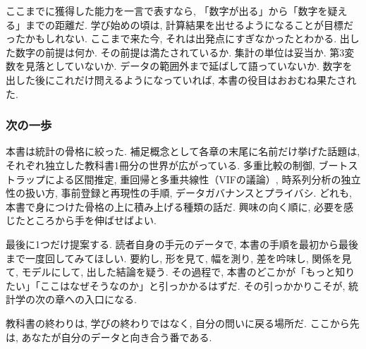 ここまでに獲得した能力を一言で表すなら, 「数字が出る」から「数字を疑える」までの距離だ.
学び始めの頃は, 計算結果を出せるようになることが目標だったかもしれない.
ここまで来た今, それは出発点にすぎなかったとわかる.
出した数字の前提は何か. その前提は満たされているか. 集計の単位は妥当か. 第3変数を見落としていないか. データの範囲外まで延ばして語っていないか.
数字を出した後にこれだけ問えるようになっていれば, 本書の役目はおおむね果たされた.

\subsubsection*{次の一歩}

本書は統計の骨格に絞った. 補足概念として各章の末尾に名前だけ挙げた話題は, それぞれ独立した教科書1冊分の世界が広がっている.
多重比較の制御, ブートストラップによる区間推定, 重回帰と多重共線性（VIFの議論）, 時系列分析の独立性の扱い方, 事前登録と再現性の手順, データガバナンスとプライバシ.
どれも, 本書で身につけた骨格の上に積み上げる種類の話だ.
興味の向く順に, 必要を感じたところから手を伸ばせばよい.

最後に1つだけ提案する.
読者自身の手元のデータで, 本書の手順を最初から最後まで一度回してみてほしい.
要約し, 形を見て, 幅を測り, 差を吟味し, 関係を見て, モデルにして, 出した結論を疑う.
その過程で, 本書のどこかが「もっと知りたい」「ここはなぜそうなのか」と引っかかるはずだ.
その引っかかりこそが, 統計学の次の章への入口になる.

教科書の終わりは, 学びの終わりではなく, 自分の問いに戻る場所だ.
ここから先は, あなたが自分のデータと向き合う番である.
